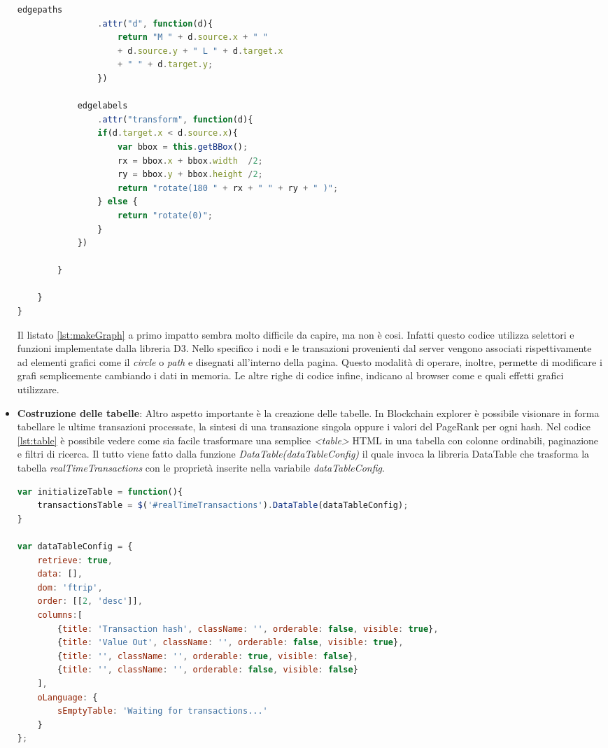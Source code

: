 \begin{itemize}
\begin{lstlisting}[language=Javascript, label=lst:makeGraph, caption={Funzione per grafi.}]
            edgepaths
                .attr("d", function(d){
                    return "M " + d.source.x + " " 
                    + d.source.y + " L " + d.target.x 
                    + " " + d.target.y;
                })

            edgelabels
                .attr("transform", function(d){
                if(d.target.x < d.source.x){
                    var bbox = this.getBBox();
                    rx = bbox.x + bbox.width  /2;
                    ry = bbox.y + bbox.height /2;
                    return "rotate(180 " + rx + " " + ry + " )";
                } else {
                    return "rotate(0)";
                }
            })

        }

    }
}
\end{lstlisting}

Il listato \ref{lst:makeGraph} a primo impatto sembra molto difficile da capire, ma non è cosi. Infatti questo codice utilizza selettori e funzioni implementate dalla libreria D3. Nello specifico i nodi e le transazioni provenienti dal server vengono associati rispettivamente ad elementi grafici come il \textit{circle} o \textit{path} e disegnati all'interno della pagina. Questo modalità di operare, inoltre, permette di modificare i grafi semplicemente cambiando i dati in memoria. Le altre righe di codice infine, indicano al browser come e quali effetti grafici utilizzare.
 
\item \textbf{Costruzione delle tabelle}: Altro aspetto importante è la creazione delle tabelle. In Blockchain explorer è possibile visionare in forma tabellare le ultime transazioni processate, la sintesi di una transazione singola oppure i valori del PageRank per ogni hash. Nel codice \ref{lst:table}  è possibile vedere come sia facile trasformare una semplice \textit{<table>} HTML in una tabella con colonne ordinabili, paginazione e filtri di ricerca. Il tutto viene fatto dalla funzione \textit{DataTable(dataTableConfig)} il quale invoca la libreria DataTable che trasforma la tabella \textit{realTimeTransactions} con le proprietà inserite nella variabile \textit{dataTableConfig}.

\begin{lstlisting}[language=Javascript, label=lst:table, caption={Utilizzo DataTable.}]
var initializeTable = function(){
    transactionsTable = $('#realTimeTransactions').DataTable(dataTableConfig);
}

var dataTableConfig = {
    retrieve: true,
    data: [],
    dom: 'ftrip',
    order: [[2, 'desc']],
    columns:[
        {title: 'Transaction hash', className: '', orderable: false, visible: true},
        {title: 'Value Out', className: '', orderable: false, visible: true},
        {title: '', className: '', orderable: true, visible: false},
        {title: '', className: '', orderable: false, visible: false}
    ],
    oLanguage: {
        sEmptyTable: 'Waiting for transactions...'
    }
};
\end{lstlisting}


\end{itemize}
